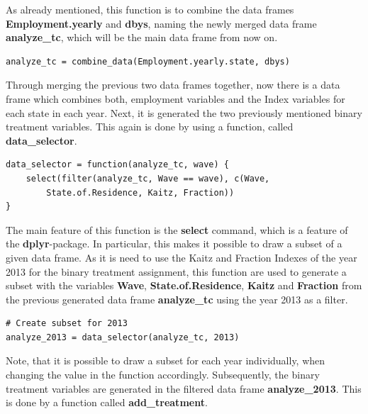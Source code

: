 \documentclass[a4paper]{article}
\begin{document}
{As already mentioned, this function is to combine the data frames \textbf{Employment.yearly} and \textbf{dbys}, naming the newly merged data frame \textbf{analyze\_tc}, which will be the main data frame from now on.
\begin{lstlisting}
analyze_tc = combine_data(Employment.yearly.state, dbys)
\end{lstlisting}
Through merging the previous two data frames together, now there is a data frame which combines both, employment variables and the Index variables for each state in each year. \newline
Next, it is generated the two previously mentioned binary treatment variables. This again is done by using a function, called \textbf{data\_selector}.
\begin{lstlisting}
data_selector = function(analyze_tc, wave) {
    select(filter(analyze_tc, Wave == wave), c(Wave,
    	State.of.Residence, Kaitz, Fraction))
}
\end{lstlisting}
The main feature of this function is the \textbf{select} command, which is a feature of the \textbf{dplyr}-package. In particular, this makes it possible to draw a subset of a given data frame. As it is need to use the Kaitz and Fraction Indexes of the year 2013 for the binary treatment assignment, this function are used to generate a subset with the variables \textbf{Wave}, \textbf{State.of.Residence}, \textbf{Kaitz} and \textbf{Fraction} from the previous generated data frame \textbf{analyze\_tc} using the year 2013 as a filter.
\begin{lstlisting}
# Create subset for 2013
analyze_2013 = data_selector(analyze_tc, 2013)
\end{lstlisting}
Note, that it is possible to draw a subset for each year individually, when changing the value in the function accordingly. \newline
Subsequently, the binary treatment variables are generated in the filtered data frame \textbf{analyze\_2013}. This is done by a function called \textbf{add\_treatment}.

}
\end{document}
